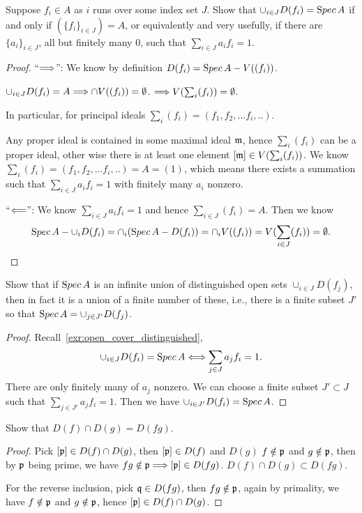\documentclass[11pt,fleqn]{book}
\begin{document}
\begin{exr}\label{exr:open_cover_distinguished}
Suppose $f_i \in A$ as $i$ runs over some index set $J$. Show that $\cup_{i\in J}D(f_i) = {\text Spec\,} A$ if and only if $(\{f_i\}_{i\in J}) = A$, or equivalently and very usefully,
if there are $ \{a_i\}_{i\in J} $, all but finitely many $0$, such that 
$\sum_{i\in J}a_if_i = 1$.
\end{exr}
\begin{proof}
``$\Longrightarrow$'': We know by definition $D(f_i)={\text Spec\,} A-V((f_i))$.

$\cup_{i\in J}D(f_i)=A\Longrightarrow \cap V((f_i))=\emptyset$. $\Longrightarrow V(\sum_i(f_i))=\emptyset$.

In particular, for principal ideals 
$\sum_i(f_i)=(f_1,f_2,...f_i,..)$.

Any proper ideal is contained in some maximal ideal ${\mathfrak m}$, hence $\sum_i(f_i)$ can be a proper ideal, other wise there is at least one element $[{\mathfrak m}]\in V(\sum_i (f_i))$. We know $\sum_i(f_i)=(f_1,f_2,...f_i,..)=A=(1)$, which means there exists a summation such that $\sum_{i\in J}a_if_i = 1$ with finitely many $a_i$ nonzero.

``$\Longleftarrow$'': We know $\sum_{i\in J}a_if_i = 1$ and hence $\sum_{i\in J} (f_i)=A$. Then we know
$$
{\text Spec\,} A-\cup_i D(f_i)=\cap_i ({\text Spec\,} A-D(f_i))=\cap_i V((f_i))=V(\sum_{i\in J} (f_i))=\emptyset.
$$
\end{proof}


\begin{exr}\label{exr:distinguished_open_cover}
Show that if ${\text Spec\,} A $ is an infinite union of distinguished open sets $\cup_{i\in J}D(f_j)$, then in fact it is a union of a finite number of these, i.e., there is a finite subset $J'$ so that ${\text Spec\,} A = \cup_{j\in J'}  D(f_j)$. 
\end{exr}
\begin{proof}
Recall~\ref{exr:open_cover_distinguished},
$$
\cup_{i\in J}D(f_i) = {\text Spec\,} A\Longleftrightarrow \sum_{j\in J}a_j f_i=1.
$$
There are only finitely many of $a_j$ nonzero. We can choose a finite subset $J'\subset J$ such that $\sum_{j\in J'}a_j f_i=1$. Then we have $\cup_{i\in J'}D(f_i) = {\text Spec\,} A$.
\end{proof}

\begin{exr}
Show that $D(f) \cap D(g) = D(fg)$.
\end{exr}
\begin{proof}
Pick $[{\mathfrak p}]\in D(f) \cap D(g)$, then $[{\mathfrak p}]\in D(f)$ and $D(g)$ $f\notin {\mathfrak p}$ and $g\notin {\mathfrak p}$, then by ${\mathfrak p}$ being prime, we have $fg\notin{\mathfrak p}\Longrightarrow [{\mathfrak p}]\in D(fg)$. $D(f) \cap D(g)\subset D(fg)$.

For the reverse inclusion, pick $\mathfrak q\in D(fg)$, then $fg\notin {\mathfrak p}$, again by primality, we have $f\notin{\mathfrak p}$ and $g\notin{\mathfrak p}$, hence $[{\mathfrak p}]\in D(f)\cap D(g)$.
\end{proof}
\end{document}
